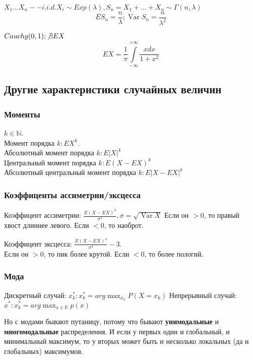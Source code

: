 \documentclass{article}
\DeclareMathOperator{\Var}{Var}
\begin{document}
    \begin{example}
        $X_1 \dots X_n -- i.i.d. X_i \sim Exp(\lambda), S_n = X_1 + \dots + X_n \sim \Gamma (n, \lambda) $
        $$ ES_n = \frac{n}{\lambda}; \Var S_n = \frac{n}{\lambda^2}$$
    \end{example}
    \begin{example}
        $Cauchy(0, 1); \not \exists EX$
        $$ EX = \frac{1}{\pi} \int\limits_{-\infty}^{+\infty} \frac{xdx}{1+x^2}$$
    \end{example}
    \subsection{Другие характеристики случайных величин}
    \subsubsection{Моменты}
    \begin{definition}
        $k \in \mathbb{N}$.\\
        Момент порядка $k: EX^k$. \\
        Абсолютный момент порядка $k: E|X|^k$\\
        Центральный момент порядка $k: E(X - EX)^k$\\
        Абсолютный центральный момент порядка $k: E|X - EX|^k$
    \end{definition}
    \subsubsection{Коэффиценты ассиметрии/эксцесса}
    \begin{definition}
        Коэффицент ассиметрии: $ \frac{E(X-EX)^3}{\sigma^3}, \sigma = \sqrt{\Var X} $
        Если он $>0$, то правый хвост длиннее левого. Если $<0$, то наоброт.
    \end{definition}
    \begin{definition}
    Коэффицент эксцесса: $\frac{E(X-EX)^4}{\sigma^4} - 3$. \\
     Если он $>0$, то пик более крутой. Если $<0$, то более пологий.
    \end{definition}
    
    \subsubsection{Мода}
    \begin{definition}
            Дискретный случай: $x_k^*: x_k^* = arg\max_{x_k} P(X=x_k)$
            Непрерывный случай: $x^*: x_k^* = arg\max_{x \in \mathbb{R}} p(x)$
    \end{definition}
    \begin{remark}
    Но с модами бывают путаницу, потому что бывают \textbf{унимодальные} и \textbf{многомодальные} распределения. И если у первых один и глобальный, и минимальный максимум, то у вторых может быть и несколько локальных (да и глобальных) максимумов. 
    \end{remark}
\end{document}
